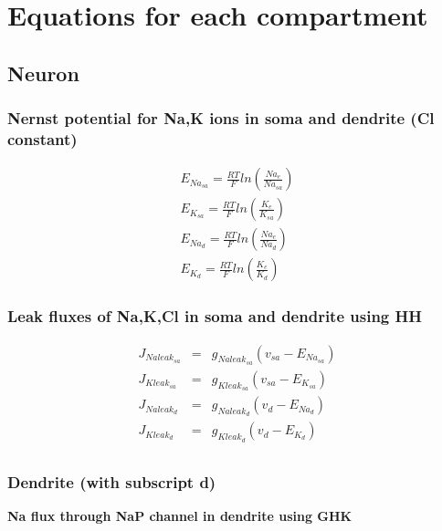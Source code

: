 \documentclass[fleqn]{report}
\numberwithin{equation}{section}
\numberwithin{equation}{section}
\newcommand{\RTF}{$\frac{RT}{F}$}
\begin{document}
				            
	\chapter{Equations for each  compartment }
	\section{Neuron}
	\subsection{Nernst potential for Na,K ions in soma and dendrite (Cl constant)} 
				            				\begin{eqnarray}
				            					E_{Na_{sa}}=\frac{RT}{F}ln (\frac{Na_e}{Na_{sa}}) \\
				            					 E_{K_{sa}}      =\frac{RT}{F}  ln(\frac{K_e}{K_{sa}})\\
				            					 E_{Na_{d}}      =\frac{RT}{F}  ln(\frac{Na_e}{Na_{d}})\\
				            					 E_{K_{d}}      =\frac{RT}{F}  ln(\frac{K_e}{K_{d}})
				            				\end{eqnarray}
	\subsection{Leak fluxes of Na,K,Cl in soma and dendrite using HH}
				 \begin{eqnarray}
				J_{Naleak_{sa}} &=& g_{Naleak_{sa}} (v_{sa} - E_{Na_{sa}})\\
								                        J_{Kleak_{sa}}  &=& g_{Kleak_{sa}} (v_{sa} - E_{K_{sa}})\\
								                        J_{Naleak_{d}}  &=& g_{Naleak_d} (v_d - E_{Na_{d}})\\
								                        J_{Kleak_{d}}   &=& g_{Kleak_d} (v_d - E_{K_{d}})\\
				 \end{eqnarray}
				                        
	\subsection{Dendrite (with subscript d)}
	 \textbf{Na flux through NaP channel in dendrite using GHK}\\
	 
\end{document}
